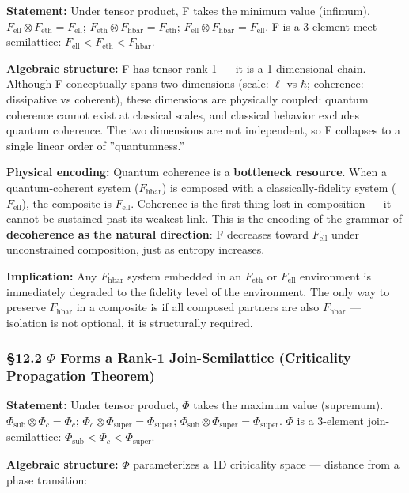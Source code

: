 \documentclass[12pt,a4paper]{article}
\newcommand{\pilcrow}{\S}
\begin{document}
\textbf{Statement:} Under tensor product, F takes the minimum value (infimum). $F_{\text{ell}} \otimes F_{\text{eth}} = F_{\text{ell}}$; $F_{\text{eth}} \otimes F_{\text{hbar}} = F_{\text{eth}}$; $F_{\text{ell}} \otimes F_{\text{hbar}} = F_{\text{ell}}$. F is a 3-element meet-semilattice: $F_{\text{ell}} < F_{\text{eth}} < F_{\text{hbar}}$.

\textbf{Algebraic structure:} F has tensor rank 1 --- it is a 1-dimensional chain. Although F conceptually spans two dimensions (scale: $\ell$ vs $\hbar$; coherence: dissipative vs coherent), these dimensions are physically coupled: quantum coherence cannot exist at classical scales, and classical behavior excludes quantum coherence. The two dimensions are not independent, so F collapses to a single linear order of ''quantumness.''

\textbf{Physical encoding:} Quantum coherence is a \textbf{bottleneck resource}. When a quantum-coherent system ($F_{\text{hbar}}$) is composed with a classically-fidelity system ($F_{\text{ell}}$), the composite is $F_{\text{ell}}$. Coherence is the first thing lost in composition --- it cannot be sustained past its weakest link. This is the encoding of the grammar of \textbf{decoherence as the natural direction}: F decreases toward $F_{\text{ell}}$ under unconstrained composition, just as entropy increases.

\textbf{Implication:} Any $F_{\text{hbar}}$ system embedded in an $F_{\text{eth}}$ or $F_{\text{ell}}$ environment is immediately degraded to the fidelity level of the environment. The only way to preserve $F_{\text{hbar}}$ in a composite is if all composed partners are also $F_{\text{hbar}}$ --- isolation is not optional, it is structurally required.

\subsubsection{\pilcrow{}12.2 $\Phi$ Forms a Rank-1 Join-Semilattice (Criticality Propagation Theorem)}

\textbf{Statement:} Under tensor product, $\Phi$ takes the maximum value (supremum). $\Phi_{\text{sub}} \otimes \Phi_c = \Phi_c$; $\Phi_c \otimes \Phi_{\text{super}} = \Phi_{\text{super}}$; $\Phi_{\text{sub}} \otimes \Phi_{\text{super}} = \Phi_{\text{super}}$. $\Phi$ is a 3-element join-semilattice: $\Phi_{\text{sub}} < \Phi_c < \Phi_{\text{super}}$.

\textbf{Algebraic structure:} $\Phi$ parameterizes a 1D criticality space --- distance from a phase transition:
\end{document}
